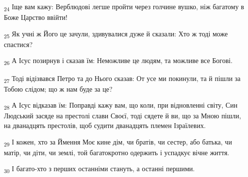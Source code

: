 \begin{tcolorbox}
\textsubscript{24} Іще вам кажу: Верблюдові легше пройти через голчине вушко, ніж багатому в Боже Царство ввійти!
\end{tcolorbox}
\begin{tcolorbox}
\textsubscript{25} Як учні ж Його це зачули, здивувалися дуже й сказали: Хто ж тоді може спастися?
\end{tcolorbox}
\begin{tcolorbox}
\textsubscript{26} А Ісус позирнув і сказав їм: Неможливе це людям, та можливе все Богові.
\end{tcolorbox}
\begin{tcolorbox}
\textsubscript{27} Тоді відізвався Петро та до Нього сказав: От усе ми покинули, та й пішли за Тобою слідом; що ж нам буде за це?
\end{tcolorbox}
\begin{tcolorbox}
\textsubscript{28} А Ісус відказав їм: Поправді кажу вам, що коли, при відновленні світу, Син Людський засяде на престолі слави Своєї, тоді сядете й ви, що за Мною пішли, на дванадцять престолів, щоб судити дванадцять племен Ізраїлевих.
\end{tcolorbox}
\begin{tcolorbox}
\textsubscript{29} І кожен, хто за Ймення Моє кине дім, чи братів, чи сестер, або батька, чи матір, чи діти, чи землі, той багатокротно одержить і успадкує вічне життя.
\end{tcolorbox}
\begin{tcolorbox}
\textsubscript{30} І багато-хто з перших останніми стануть, а останні першими.
\end{tcolorbox}

